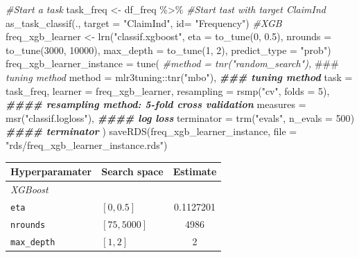 \documentclass[
]{article}
\newenvironment{Shaded}{\begin{snugshade}}{\end{snugshade}}
\newcommand{\AlertTok}[1]{\textcolor[rgb]{0.94,0.16,0.16}{#1}}
\newcommand{\AttributeTok}[1]{\textcolor[rgb]{0.77,0.63,0.00}{#1}}
\newcommand{\CommentTok}[1]{\textcolor[rgb]{0.56,0.35,0.01}{\textit{#1}}}
\newcommand{\DecValTok}[1]{\textcolor[rgb]{0.00,0.00,0.81}{#1}}
\newcommand{\DocumentationTok}[1]{\textcolor[rgb]{0.56,0.35,0.01}{\textbf{\textit{#1}}}}
\newcommand{\FloatTok}[1]{\textcolor[rgb]{0.00,0.00,0.81}{#1}}
\newcommand{\FunctionTok}[1]{\textcolor[rgb]{0.00,0.00,0.00}{#1}}
\newcommand{\NormalTok}[1]{#1}
\newcommand{\OtherTok}[1]{\textcolor[rgb]{0.56,0.35,0.01}{#1}}
\newcommand{\SpecialCharTok}[1]{\textcolor[rgb]{0.00,0.00,0.00}{#1}}
\newcommand{\StringTok}[1]{\textcolor[rgb]{0.31,0.60,0.02}{#1}}
\begin{document}
\begin{Shaded}
\begin{Highlighting}[]
\CommentTok{\#Start a task}
\NormalTok{task\_freq }\OtherTok{\textless{}{-}}\NormalTok{ df\_freq }\SpecialCharTok{\%\textgreater{}\%}
  \CommentTok{\#Start tast with target ClaimInd}
  \FunctionTok{as\_task\_classif}\NormalTok{(.,}
               \AttributeTok{target =} \StringTok{"ClaimInd"}\NormalTok{,}
               \AttributeTok{id=} \StringTok{"Frequency"}\NormalTok{)}
\CommentTok{\#XGB}
\NormalTok{freq\_xgb\_learner }\OtherTok{\textless{}{-}} \FunctionTok{lrn}\NormalTok{(}\StringTok{"classif.xgboost"}\NormalTok{, }
                        \AttributeTok{eta =} \FunctionTok{to\_tune}\NormalTok{(}\DecValTok{0}\NormalTok{, }\FloatTok{0.5}\NormalTok{),}
                        \AttributeTok{nrounds =} \FunctionTok{to\_tune}\NormalTok{(}\DecValTok{3000}\NormalTok{, }\DecValTok{10000}\NormalTok{),}
                        \AttributeTok{max\_depth =} \FunctionTok{to\_tune}\NormalTok{(}\DecValTok{1}\NormalTok{, }\DecValTok{2}\NormalTok{),}
                        \AttributeTok{predict\_type =} \StringTok{"prob"}\NormalTok{)}
\NormalTok{freq\_xgb\_learner\_instance }\OtherTok{=} \FunctionTok{tune}\NormalTok{(}
    \CommentTok{\#method = tnr("random\_search"), }\AlertTok{\#\#\#}\CommentTok{ tuning method}
    \AttributeTok{method =}\NormalTok{ mlr3tuning}\SpecialCharTok{::}\FunctionTok{tnr}\NormalTok{(}\StringTok{"mbo"}\NormalTok{), }\DocumentationTok{\#\#\# tuning method}
    \AttributeTok{task =}\NormalTok{ task\_freq,}
    \AttributeTok{learner =}\NormalTok{ freq\_xgb\_learner,}
    \AttributeTok{resampling =} \FunctionTok{rsmp}\NormalTok{(}\StringTok{"cv"}\NormalTok{, }\AttributeTok{folds =} \DecValTok{5}\NormalTok{), }\DocumentationTok{\#\#\#\# resampling method: 5{-}fold cross validation}
    \AttributeTok{measures =} \FunctionTok{msr}\NormalTok{(}\StringTok{"classif.logloss"}\NormalTok{), }\DocumentationTok{\#\#\#\# log loss}
    \AttributeTok{terminator =} \FunctionTok{trm}\NormalTok{(}\StringTok{"evals"}\NormalTok{, }\AttributeTok{n\_evals =} \DecValTok{500}\NormalTok{) }\DocumentationTok{\#\#\#\# terminator}
\NormalTok{  )}
\FunctionTok{saveRDS}\NormalTok{(freq\_xgb\_learner\_instance, }\AttributeTok{file =} \StringTok{"rds/freq\_xgb\_learner\_instance.rds"}\NormalTok{)}
\end{Highlighting}
\end{Shaded}

\begin{longtable}[]{@{}llc@{}}
\toprule()
\textbf{Hyperparamater} & \textbf{Search space} & \textbf{Estimate} \\
\midrule()
\endhead
\emph{XGBoost} & & \\
\texttt{eta} & \([0,0.5]\) & 0.1127201 \\
\texttt{nrounds} & \([75,5000]\) & 4986 \\
\texttt{max\_depth} & \([1,2]\) & 2 \\
\bottomrule()
\end{longtable}
\end{document}
